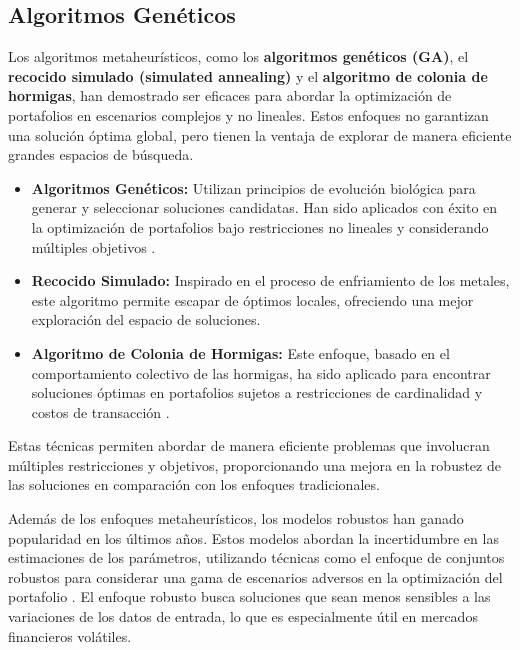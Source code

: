 \documentclass[9pt,a4paper,twoside]{rho-class/rho}
\begin{document}
        \subsection{Algoritmos Genéticos}
            Los algoritmos metaheurísticos, como los \textbf{algoritmos genéticos (GA)}, el \textbf{recocido simulado (simulated annealing)} y el \textbf{algoritmo de colonia de hormigas}, han demostrado ser eficaces para abordar la optimización de portafolios en escenarios complejos y no lineales. Estos enfoques no garantizan una solución óptima global, pero tienen la ventaja de explorar de manera eficiente grandes espacios de búsqueda.
            \begin{itemize}
                \item \textbf{Algoritmos Genéticos:} Utilizan principios de evolución biológica para generar y seleccionar soluciones candidatas. Han sido aplicados con éxito en la optimización de portafolios bajo restricciones no lineales y considerando múltiples objetivos .
                \item \textbf{Recocido Simulado:} Inspirado en el proceso de enfriamiento de los metales, este algoritmo permite escapar de óptimos locales, ofreciendo una mejor exploración del espacio de soluciones.
                \item \textbf{Algoritmo de Colonia de Hormigas:} Este enfoque, basado en el comportamiento colectivo de las hormigas, ha sido aplicado para encontrar soluciones óptimas en portafolios sujetos a restricciones de cardinalidad y costos de transacción .
            \end{itemize}
        
            \noindent Estas técnicas permiten abordar de manera eficiente problemas que involucran múltiples restricciones y objetivos, proporcionando una mejora en la robustez de las soluciones en comparación con los enfoques tradicionales.
        
            \vspace{2mm}\noindent Además de los enfoques metaheurísticos, los modelos robustos han ganado popularidad en los últimos años. Estos modelos abordan la incertidumbre en las estimaciones de los parámetros, utilizando técnicas como el enfoque de conjuntos robustos para considerar una gama de escenarios adversos en la optimización del portafolio .
            El enfoque robusto busca soluciones que sean menos sensibles a las variaciones de los datos de entrada, lo que es especialmente útil en mercados financieros volátiles.
    
\end{document}
